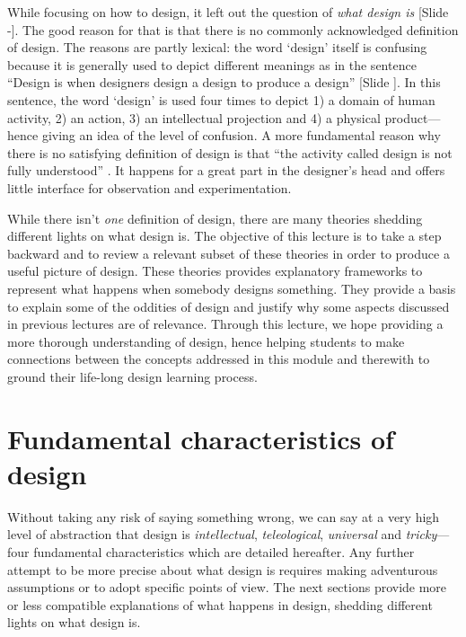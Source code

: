\documentclass{article}
\newcounter{slide}
\begin{document}
While focusing on how to design, it left out the question of \emph{what design is} {\color{blue}[Slide -]}. The good reason for that is that there is no commonly acknowledged definition of design. The reasons are partly lexical: the word `design' itself is confusing because it is generally used to depict different meanings as in the sentence ``Design is when designers design a design to produce a design'' {\color{blue}[Slide ]}\cite{heskett2001past}. In this sentence, the word `design' is used four times to depict 1) a domain of human activity, 2) an action, 3) an intellectual projection and 4) a physical product---hence giving an idea of the level of confusion. A more fundamental reason why there is no satisfying definition of design is that ``the activity called design is not fully understood'' \cite{hybsEvolutionaryProcessModel1992}. It happens for a great part in the designer's head and offers little interface for observation and experimentation.

While there isn't \emph{one} definition of design, there are many theories shedding different lights on what design is. The objective of this lecture is to take a step backward and to review a relevant subset of these theories in order to produce a useful picture of design. These theories provides explanatory frameworks to represent what happens when somebody designs something. They provide a basis to explain some of the oddities of design and justify why some aspects discussed in previous lectures are of relevance. Through this lecture, we hope providing a more thorough understanding of design, hence helping students to make connections between the concepts addressed in this module and therewith to ground their life-long design learning process.

\section{Fundamental characteristics of design}
\label{sec:whatisdesign}

Without taking any risk of saying something wrong, we can say at a very high level of abstraction that design is \emph{intellectual}, \emph{teleological}, \emph{universal} and \emph{tricky}---four fundamental characteristics which are detailed hereafter. Any further attempt to be more precise about what design is requires making adventurous assumptions or to adopt specific points of view. The next sections provide more or less compatible explanations of what happens in design, shedding different lights on what design is. 
\end{document}
